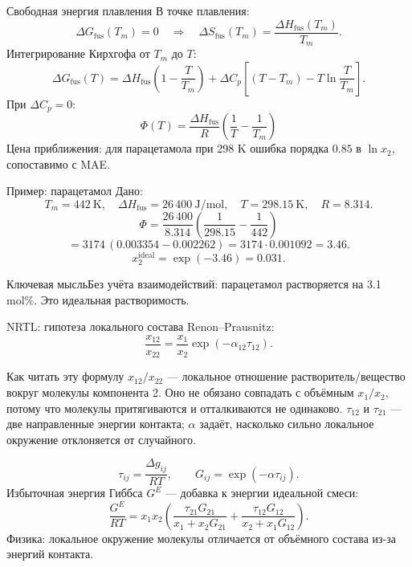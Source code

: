 \documentclass[aspectratio=169,10pt]{beamer}
\newcommand{\smallnote}[1]{{\scriptsize\color{TGSlate}#1}}
\newcommand{\keybox}[1]{\begin{block}{Ключевая мысль}#1\end{block}}
\begin{document}
\begin{frame}{Свободная энергия плавления}
  \small
  В точке плавления:
  \[
    \Delta G_{\mathrm{fus}}(T_m)=0
    \quad\Rightarrow\quad
    \Delta S_{\mathrm{fus}}(T_m)=\frac{\Delta H_{\mathrm{fus}}(T_m)}{T_m}.
  \]
  \pause
  Интегрирование Кирхгофа от $T_m$ до $T$:
  \[
    \Delta G_{\mathrm{fus}}(T)=
    \Delta H_{\mathrm{fus}}\!\left(1-\frac{T}{T_m}\right)
    +\Delta C_p\!\left[(T-T_m)-T\ln\frac{T}{T_m}\right].
  \]
  \pause
  При $\Delta C_p=0$:
  \[
    \boxed{\Phi(T)=\frac{\Delta H_{\mathrm{fus}}}{R}\left(\frac{1}{T}-\frac{1}{T_m}\right)}
  \]
  \pause
  \smallnote{Цена приближения: для парацетамола при 298 K ошибка порядка $0.85$ в $\ln x_2$, сопоставимо с MAE.}
\end{frame}

\begin{frame}{Пример: парацетамол}
  \small
  Дано:
  \[
    T_m=442\ \mathrm{K},\quad
    \Delta H_{\mathrm{fus}}=26\,400\ \mathrm{J/mol},\quad
    T=298.15\ \mathrm{K},\quad
    R=8.314.
  \]
  \pause
  \[
    \Phi
    =
    \frac{26\,400}{8.314}
    \left(\frac{1}{298.15}-\frac{1}{442}\right)
  \]
  \pause
  \[
    =
    3174\,(0.003354-0.002262)
    =
    3174\cdot0.001092
    =
    3.46.
  \]
  \pause
  \[
    x_2^{\mathrm{ideal}}=\exp(-3.46)=0.031.
  \]
  \pause
  \keybox{Без учёта взаимодействий: парацетамол растворяется на 3.1 mol\%. Это идеальная растворимость.}
\end{frame}

\begin{frame}{NRTL: гипотеза локального состава}
  \small
  Renon–Prausnitz:
  \[
    \frac{x_{12}}{x_{22}}=\frac{x_1}{x_2}\exp(-\alpha_{12}\tau_{12}).
  \]
  \pause
  \begin{block}{Как читать эту формулу}
    \scriptsize
    $x_{12}/x_{22}$ — локальное отношение растворитель/вещество вокруг молекулы компонента 2. Оно не обязано совпадать с объёмным $x_1/x_2$, потому что молекулы притягиваются и отталкиваются не одинаково. $\tau_{12}$ и $\tau_{21}$ — две направленные энергии контакта; $\alpha$ задаёт, насколько сильно локальное окружение отклоняется от случайного.
  \end{block}
  \pause
  \[
    \tau_{ij}=\frac{\Delta g_{ij}}{RT},
    \qquad
    G_{ij}=\exp(-\alpha\tau_{ij}).
  \]
  \pause
  Избыточная энергия Гиббса $G^E$ — добавка к энергии идеальной смеси:
  \[
    \frac{G^E}{RT}
    =x_1x_2
    \left(
      \frac{\tau_{21}G_{21}}{x_1+x_2G_{21}}
      +
      \frac{\tau_{12}G_{12}}{x_2+x_1G_{12}}
    \right).
  \]
  \smallnote{Физика: локальное окружение молекулы отличается от объёмного состава из-за энергий контакта.}
\end{frame}
\end{document}

